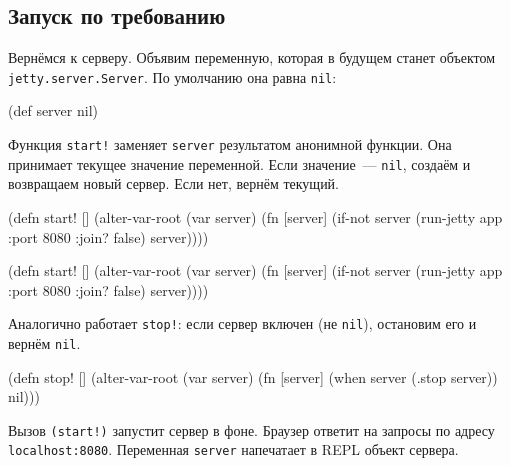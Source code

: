 \subsection{Запуск по требованию}

Вернёмся к серверу. Объявим переменную, которая в будущем станет объектом
\texttt{jetty.server\-.Server}. По умолчанию она равна \verb|nil|:

\begin{english}
  \begin{clojure}
(def server nil)
  \end{clojure}
\end{english}

Функция \verb|start!| заменяет \verb|server| результатом анонимной функции. Она
принимает текущее значение переменной. Если значение~--- \verb|nil|, создаём и
возвращаем новый сервер. Если нет, вернём текущий.

\ifnarrow

\begin{english}
  \begin{clojure}
(defn start! []
  (alter-var-root
   (var server)
   (fn [server]
     (if-not server
       (run-jetty app {:port 8080
                       :join? false})
       server))))
  \end{clojure}
\end{english}

\else

\begin{english}
  \begin{clojure}
(defn start! []
  (alter-var-root
   (var server)
   (fn [server]
     (if-not server
       (run-jetty app {:port 8080 :join? false})
       server))))
  \end{clojure}
\end{english}

\fi

\noindent
Аналогично работает \verb|stop!|: если сервер включен (не \verb|nil|),
остановим его и вернём \verb|nil|.

\begin{english}
  \begin{clojure}
(defn stop! []
  (alter-var-root
   (var server)
   (fn [server]
     (when server
       (.stop server))
     nil)))
  \end{clojure}
\end{english}

Вызов \verb|(start!)| запустит сервер в фоне. Браузер ответит на запросы по
адресу \texttt{localhost\-:8080}. Переменная \verb|server| напечатает в REPL
объект сервера.

